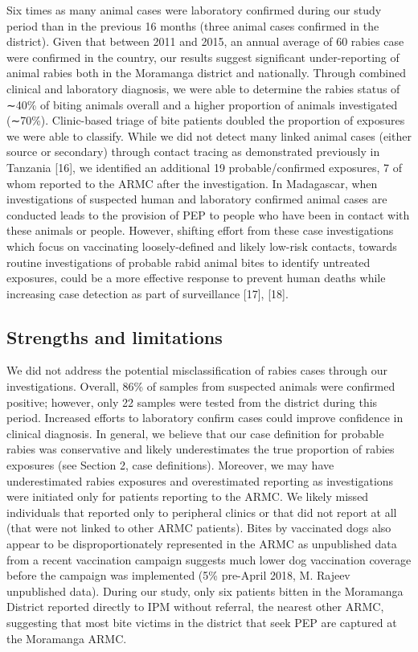 \documentclass[
  oneside]{book}
\begin{document}
Six times as many animal cases were laboratory confirmed during our study period than in the previous 16 months (three animal cases confirmed in the district). Given that between 2011 and 2015, an annual average of 60 rabies case were confirmed in the country, our results suggest significant under-reporting of animal rabies both in the Moramanga district and nationally. Through combined clinical and laboratory diagnosis, we were able to determine the rabies status of ∼40\% of biting animals overall and a higher proportion of animals investigated (∼70\%). Clinic-based triage of bite patients doubled the proportion of exposures we were able to classify. While we did not detect many linked animal cases (either source or secondary) through contact tracing as demonstrated previously in Tanzania {[}16{]}, we identified an additional 19 probable/confirmed exposures, 7 of whom reported to the ARMC after the investigation. In Madagascar, when investigations of suspected human and laboratory confirmed animal cases are conducted leads to the provision of PEP to people who have been in contact with these animals or people. However, shifting effort from these case investigations which focus on vaccinating loosely-defined and likely low-risk contacts, towards routine investigations of probable rabid animal bites to identify untreated exposures, could be a more effective response to prevent human deaths while increasing case detection as part of surveillance {[}17{]}, {[}18{]}.

\hypertarget{strengths-and-limitations}{%
\subsection{Strengths and limitations}\label{strengths-and-limitations}}

We did not address the potential misclassification of rabies cases through our investigations. Overall, 86\% of samples from suspected animals were confirmed positive; however, only 22 samples were tested from the district during this period. Increased efforts to laboratory confirm cases could improve confidence in clinical diagnosis. In general, we believe that our case definition for probable rabies was conservative and likely underestimates the true proportion of rabies exposures (see Section 2, case definitions). Moreover, we may have underestimated rabies exposures and overestimated reporting as investigations were initiated only for patients reporting to the ARMC. We likely missed individuals that reported only to peripheral clinics or that did not report at all (that were not linked to other ARMC patients). Bites by vaccinated dogs also appear to be disproportionately represented in the ARMC as unpublished data from a recent vaccination campaign suggests much lower dog vaccination coverage before the campaign was implemented (5\% pre-April 2018, M. Rajeev unpublished data). During our study, only six patients bitten in the Moramanga District reported directly to IPM without referral, the nearest other ARMC, suggesting that most bite victims in the district that seek PEP are captured at the Moramanga ARMC.
\end{document}
